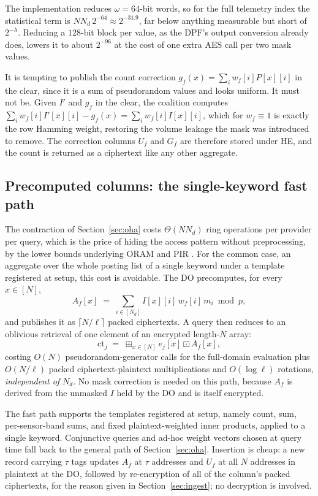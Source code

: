 \documentclass[a4paper,fleqn]{cas-dc}
\newcommand{\bplus}{\boxplus}
\newcommand{\bdot}{\boxdot}
\begin{document}
The implementation reduces $\omega=64$-bit words, so for the full telemetry index
the statistical term is $N N_d\,2^{-64}\approx 2^{-31.9}$, far below anything
measurable but short of $2^{-\lambda}$. Reducing a $128$-bit block per value,
as the DPF's output conversion already does, lowers it to about $2^{-96}$ at
the cost of one extra AES call per two mask values.

\begin{remark}
\label{rem:whyenc}
It is tempting to publish the count correction
$g_f(x)=\sum_i w_f[i]P[x][i]$ in the clear, since it is a sum of pseudorandom
values and looks uniform. It must not be. Given $I'$ and $g_f$ in the clear,
the coalition computes $\sum_i w_f[i]I'[x][i]-g_f(x)=\sum_i w_f[i]I[x][i]$,
which for $w_f\equiv 1$ is exactly the row Hamming weight, restoring the
volume leakage the mask was introduced to remove. The correction columns $U_f$
and $G_f$ are therefore stored under HE, and the count is returned as a
ciphertext like any other aggregate.
\end{remark}

\subsection{Precomputed columns: the single-keyword fast path}
\label{sec:fast}
The contraction of Section~\ref{sec:oha} costs $\Theta(N N_d)$ ring operations
per provider per query, which is the price of hiding the access pattern
without preprocessing, by the lower bounds underlying ORAM and PIR
\citep{goldreich1996software,beimel2000reducing}. For the common case, an
aggregate over the whole posting list of a single keyword under a template
registered at setup, this cost is avoidable. The DO precomputes, for every
$x\in[N]$,
\[
A_f[x] \;=\; \sum_{i\in[N_d]} I[x][i]\,w_f[i]\,m_i \bmod p ,
\]
and publishes it as $\lceil N/\ell\rceil$ packed ciphertexts. A query then
reduces to an oblivious retrieval of one element of an encrypted length-$N$
array:
\[
\text{ct}_j \;=\; \bplus_{x\in[N]} e_j[x]\bdot A_f[x],
\]
costing $O(N)$ pseudorandom-generator calls for the full-domain evaluation
plus $O(N/\ell)$ packed ciphertext-plaintext multiplications and
$O(\log \ell)$ rotations, \emph{independent of $N_d$}. No mask correction is
needed on this path, because $A_f$ is derived from the unmasked $I$ held by
the DO and is itself encrypted.

The fast path supports the templates registered at setup, namely count, sum,
per-sensor-band sums, and fixed plaintext-weighted inner products, applied to
a single keyword. Conjunctive queries and ad-hoc weight vectors chosen at
query time fall back to the general path of Section~\ref{sec:oha}. Insertion
is cheap: a new record carrying $\tau$ tags updates $A_f$ at $\tau$ addresses
and $U_f$ at all $N$ addresses in plaintext at the DO, followed by
re-encryption of all of the column's packed ciphertexts, for the reason given
in Section~\ref{sec:ingest}; no decryption is involved.
\end{document}
